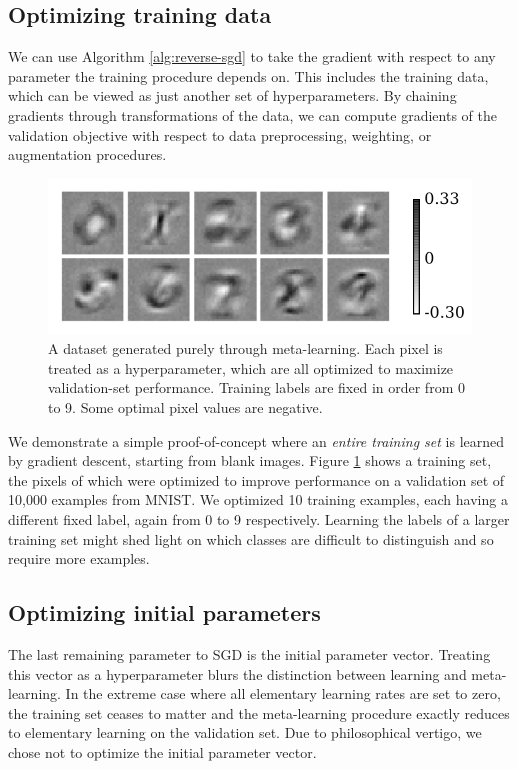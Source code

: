 \documentclass{article}
\newcommand{\primal}{elementary}
\begin{document}
\subsection{Optimizing training data}

We can use Algorithm \ref{alg:reverse-sgd} to take the gradient with respect to any parameter the training procedure depends on.
This includes the training data, which can be viewed as just another set of hyperparameters.
By chaining gradients through transformations of the data, we can compute gradients of the validation objective with respect to data preprocessing, weighting, or augmentation procedures.

%
\begin{figure}[b]
\begin{center}
\includegraphics[width=\columnwidth]{../experiments/Jan_19_optimize_data/9_color_bar/fake_data.pdf}
\vskip -0.1in
\caption{A dataset generated purely through meta-learning.
Each pixel is treated as a hyperparameter, which are all optimized to maximize validation-set performance.
Training labels are fixed in order from 0 to 9.
Some optimal pixel values are negative.}
\label{fig:fake data}
\end{center}
\vskip -0.1in
\end{figure}
%
We demonstrate a simple proof-of-concept where an \emph{entire training set} is learned by gradient descent, starting from blank images.
Figure \ref{fig:fake data} shows a training set, the pixels of which were optimized to improve performance on a validation set of 10,000 examples from MNIST.
We optimized 10 training examples, each having a different fixed label, again from 0 to 9 respectively.
Learning the labels of a larger training set might shed light on which classes are difficult to distinguish and so require more examples.

\subsection{Optimizing initial parameters}
The last remaining parameter to SGD is the initial parameter vector.
Treating this vector as a hyperparameter blurs the distinction between learning and meta-learning.
In the extreme case where all \primal{} learning rates are set to zero, the training set ceases to matter and the meta-learning procedure exactly reduces to \primal{} learning on the validation set.
Due to philosophical vertigo, we chose not to optimize the initial parameter vector.
\end{document}
